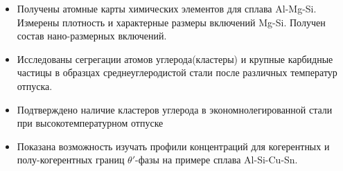 \begin{enumerate}[beginpenalty=10000]
	\begin{itemize}
		\item Получены атомные карты химических элементов для сплава Al-Mg-Si. Измерены плотность и характерные размеры включений Mg-Si. Получен состав нано-размерных включений.
		\item Исследованы сегрегации атомов углерода(кластеры) и крупные карбидные частицы в образцах среднеуглеродистой стали после различных температур отпуска.
		\item Подтверждено наличие кластеров углерода в экономнолегированной стали при высокотемпературном отпуске
		\item Показана возможность изучать профили концентраций для когерентных и полу-когерентных границ $\theta '$-фазы на примере сплава Al-Si-Cu-Sn.
	\end{itemize}
\end{enumerate}

